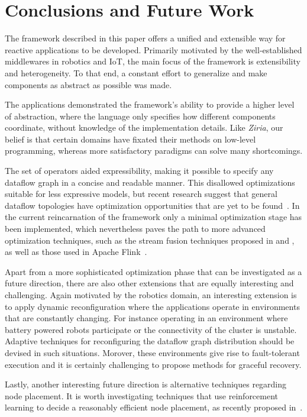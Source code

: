 \documentclass[sigplan,screen,10pt]{acmart}
\begin{document}
\section{Conclusions and Future Work} \label{sec:conclusions}

The framework described in this paper offers a unified and extensible way for
reactive applications to be developed. Primarily motivated by the well-established
middlewares in robotics and IoT, the main focus of the framework is extensibility
and heterogeneity. To that end, a constant effort to generalize and make components
as abstract as possible was made.

The applications demonstrated the framework's ability to provide a higher level
of abstraction, where the language only specifies how different components
coordinate, without knowledge of the implementation details.
Like \textit{Ziria}, our belief is that certain domains have
fixated their methods on low-level programming, whereas more satisfactory
paradigms can solve many shortcomings.

The set of operators aided expressibility, making it possible to specify any
dataflow graph in a concise and readable manner. This disallowed optimizations
suitable for less expressive models, but recent research suggest that general
dataflow topologies have optimization opportunities that are yet to be
found~\cite{blackbox}. In the current reincarnation of the framework only
a minimal optimization stage has been implemented, which nevertheless paves
the path to more advanced optimization techniques, such as the stream
fusion techniques proposed in \cite{streamfusion} and \cite{haskellfusion},
as well as those used in Apache Flink~\cite{blackbox}.

Apart from a more sophisticated optimization phase that can be investigated
as a future direction, there are also other extensions that are equally interesting
and challenging. Again motivated by the robotics domain, an interesting extension
is to apply dynamic reconfiguration where the applications operate in
environments that are constantly changing. For instance operating in an environment
where battery powered robots participate or the connectivity of the cluster is unstable.
Adaptive techniques for reconfiguring the dataflow graph distribution should be
devised in such situations. Morover, these environments give rise to fault-tolerant
execution and it is certainly challenging to propose methods for graceful recovery.

Lastly, another interesting future direction is alternative techniques regarding
node placement. It is worth investigating techniques that use reinforcement learning
to decide a reasonably efficient node placement, as recently proposed in~\cite{reinforcement}.
\end{document}
